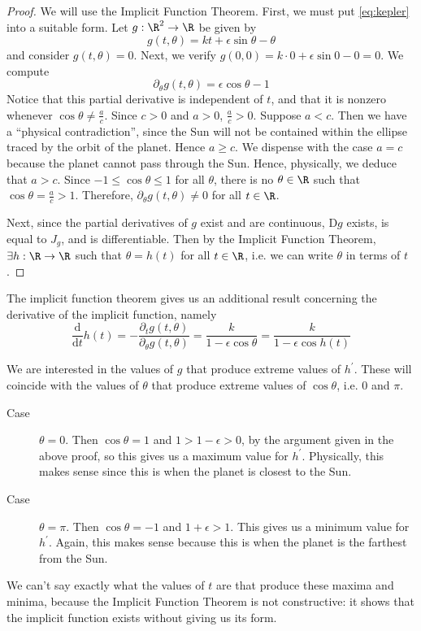 \documentclass[letterpaper,11pt]{article}
\newcommand{\D}{\mathrm{D}}
\renewcommand{\d}[2]{\frac{\mathrm{d}#1}{\mathrm{d}#2}}
\newcommand{\dd}[1]{\d{}{#1}}
\begin{document}
\begin{proof}
  We will use the Implicit Function Theorem. First, we must put
  \eqref{eq:kepler} into a suitable form. Let $g : \R^2 \to \R$ be given by
  \begin{equation*}
    g(t, \theta) = kt + \epsilon \sin \theta - \theta
  \end{equation*}
  and consider $g(t, \theta) = 0$.
  Next, we verify $g(0, 0) = k \cdot 0 + \epsilon \sin 0 - 0 = 0$.
  We compute
  \begin{equation*}
    \partial_\theta g(t, \theta) = \epsilon \cos \theta - 1
  \end{equation*}
  Notice that this partial derivative is independent of $t$, and that it is
  nonzero whenever $\cos \theta \neq \frac{a}{c}$. Since $c > 0$ and $a > 0$,
  $\frac{a}{c} > 0$. Suppose $a < c$. Then we have a ``physical
  contradiction'', since the Sun will not be contained within the ellipse
  traced by the orbit of the planet. Hence $a \geq c$. We dispense with the
  case $a = c$ because the planet cannot pass through the Sun. Hence,
  physically, we deduce that $a > c$. Since $-1 \leq \cos \theta \leq 1$ for
  all $\theta$, there is no $\theta \in \R$ such that
  $\cos \theta = \frac{a}{c} > 1$. Therefore,
  $\partial_\theta g(t, \theta) \neq 0$ for all $t \in \R$.

  Next, since the partial derivatives of $g$ exist and are continuous, $\D g$
  exists, is equal to $J_g$, and is differentiable. Then by the Implicit
  Function Theorem, $\exists h : \R \to \R$ such that $\theta = h(t)$ for all
  $t \in \R$, i.e. we can write $\theta$ in terms of $t$.
\end{proof}

The implicit function theorem gives us an additional result concerning the
derivative of the implicit function, namely
\begin{equation*}
  \dd{t} h(t)
  = - \frac{\partial_t g(t, \theta)}{\partial_\theta g(t, \theta)}
  = \frac{k}{1 - \epsilon \cos \theta}
  = \frac{k}{1 - \epsilon \cos {h(t)}}
\end{equation*}

We are interested in the values of $g$ that produce extreme values of
$h^\prime$. These will coincide with the values of $\theta$ that produce
extreme values of $\cos \theta$, i.e. $0$ and $\pi$.

\begin{description}
  \item[Case] $\theta = 0$. Then $\cos \theta = 1$ and $1 > 1 - \epsilon > 0$,
    by the argument given in the above proof, so this gives us a maximum value
    for $h^\prime$. Physically, this makes sense since this is when the planet
    is closest to the Sun.

  \item[Case] $\theta = \pi$. Then $\cos \theta = -1$ and $1 + \epsilon > 1$.
    This gives us a minimum value for $h^\prime$. Again, this makes sense
    because this is when the planet is the farthest from the Sun.
\end{description}

We can't say exactly what the values of $t$ are that produce these maxima and
minima, because the Implicit Function Theorem is not constructive: it shows
that the implicit function exists without giving us its form.
\end{document}
